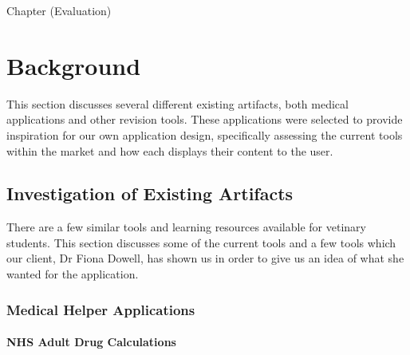 \documentclass{l3proj}
\begin{document}
Chapter (Evaluation)
\chapter{Background}
\label{background}

This section discusses several different existing artifacts, both medical applications and other revision tools. These applications were selected to provide inspiration for our own application design, specifically assessing the current tools within the market and how each displays their content to the user.

\section{Investigation of Existing Artifacts}


There are a few similar tools and learning resources available for vetinary students. This section discusses some of the current tools and a few tools which our client, Dr Fiona Dowell, has shown us in order to give us an idea of what she wanted for the application.

\subsection{Medical Helper Applications}


\subsubsection{NHS Adult Drug Calculations}
\end{document}
